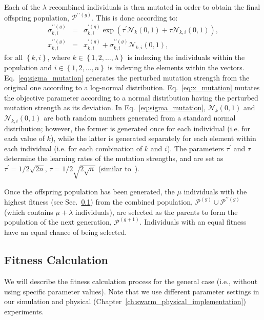 Each of the $\lambda$ recombined individuals is then mutated in order to obtain the final offspring population, $\mathcal{P}^{\prime\prime \left(g\right)}$. This is done according to:
\begin{eqnarray}
\sigma_{k,i}^{\prime\prime \left(g\right)} & = & 
\sigma_{k,i}^{\prime\left(g\right)} \exp\left(\tau^{\prime} \mathcal{N}_{k}\left(0,1\right)
+ \tau \mathcal{N}_{k,i}\left(0,1\right) \right), \label{eq:sigma_mutation}\\
x_{k,i}^{\prime\prime \left(g\right)} & 
= & x_{k,i}^{\prime\left(g\right)} + \sigma_{k,i}^{\prime\prime \left(g\right)}
\mathcal{N}_{k,i} \left(0,1\right), \label{eq:x_mutation}
\end{eqnarray}
for all $\left\{k,i\right\}$, where $k\in\left\{1,2,\dots,\lambda\right\}$ is indexing the individuals within the population and $i\in\left\{1,2,\dots,n\right\}$ is indexing the elements within the vectors. Eq.~\ref{eq:sigma_mutation} generates the perturbed mutation strength from the original one according to a log-normal distribution. Eq.~\ref{eq:x_mutation} mutates the objective parameter according to a normal distribution having the perturbed mutation strength as its deviation. In Eq.~\ref{eq:sigma_mutation}, $\mathcal{N}_{k}\left(0,1\right)$ and $\mathcal{N}_{k,i} \left(0,1\right)$ are both random numbers generated from a standard normal distribution; however, the former is generated once for each individual (i.e. for each value of $k$), while the latter is generated separately for each element within each individual (i.e. for each combination of $k$ and $i$). The parameters $\tau^{\prime}$ and $\tau$ determine the learning rates of the mutation strengths, and are set as $\tau^{\prime} = 1/2\sqrt{2n}$, $\tau = 1/2\sqrt{2\sqrt{n}}$ (similar to~\citep{Yao1999}).

Once the offspring population has been generated, the $\mu$ individuals with the highest fitness (see Sec.~\ref{sec:fitness_calculation_swarm}) from the combined population, $\mathcal{P}^{\left(g\right)}\cup \mathcal{P}^{\prime\prime\left(g\right)}$ (which contains $\mu+\lambda$ individuals), are selected as the parents to form the population of the next generation, $\mathcal{P}^{\left(g+1\right)}$. Individuals with an equal fitness have an equal chance of being selected.

\subsection{Fitness Calculation}\label{sec:fitness_calculation_swarm}
We will describe the fitness calculation process for the general case (i.e., without using specific parameter values). Note that we use different parameter settings in our simulation and physical (Chapter~\ref{ch:swarm_physical_implementation}) experiments.

